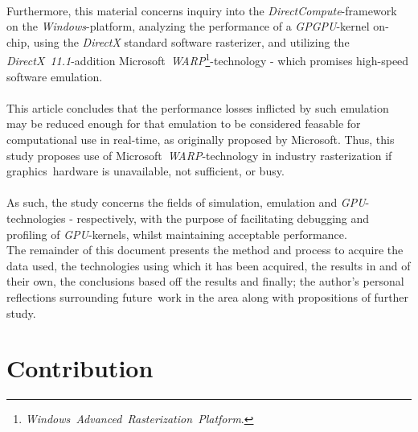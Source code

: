 \documentclass[fleqn,10pt]{SelfArx} %
\begin{document}
\\
Furthermore, this material concerns inquiry into the \textit{DirectCompute}-framework on the \textit{Windows}-platform, analyzing the performance of a \textit{GPGPU}-kernel on-chip, using the \textit{DirectX} standard software rasterizer, and utilizing the \textit{DirectX~11.1}-addition Microsoft~\textit{WARP}\footnote{\textit{Windows~Advanced~Rasterization~Platform}.}-technology - which promises high-speed software emulation. \\
\\
This article concludes that the performance losses inflicted by such emulation may be reduced enough for that emulation to be considered feasable for computational use in real-time, as originally proposed by Microsoft. Thus, this study proposes use of Microsoft~\textit{WARP}-technology in industry rasterization if graphics~hardware is unavailable, not sufficient, or busy.\\
\\
As such, the study concerns the fields of simulation, emulation and \textit{GPU}-technologies - respectively, with the purpose of facilitating debugging and profiling of \textit{GPU}-kernels, whilst maintaining acceptable performance. \\
The remainder of this document presents the method and process to acquire the data used,  the technologies using which it has been acquired, the results in and of their own, the conclusions based off the results and finally; the author's personal reflections surrounding future~work in the area along with propositions of further study.

\section{Contribution}
\label{sec:contribution}

\end{document}
